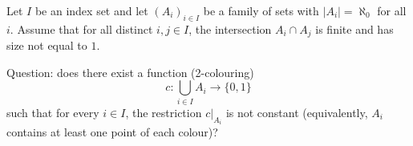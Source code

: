 \par
Let $I$ be an index set and let $(A_i)_{i\in I}$ be a family of sets with $|A_i|=\aleph_0$ for all $i$.
Assume that for all distinct $i,j\in I$, the intersection $A_i\cap A_j$ is finite and has size not equal to $1$.

Question: does there exist a function (2-colouring)
\[
 c: \bigcup_{i\in I} A_i \to \{0,1\}
\]
such that for every $i\in I$, the restriction $c|_{A_i}$ is not constant (equivalently, $A_i$ contains at least one point of each colour)?
